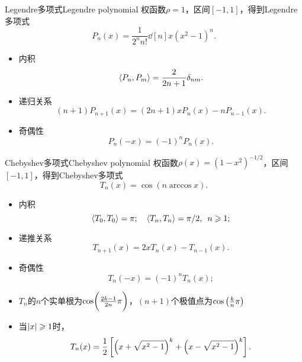\begin{example}
    {Legendre多项式}{Legendre polynomial}
    权函数$\rho=1$，区间$[-1,1]$，得到Legendre多项式
    \begin{equation}
        P_n(x)=\frac1{2^nn!}\dd[n]x(x^2-1)^n.
    \end{equation}
    \begin{itemize}
        \item 内积 
        \begin{equation}
            \left\langle P_n,P_m\right\rangle=\frac2{2n+1}\delta_{nm}.
        \end{equation}
        \item 递归关系
        \begin{equation}
            (n+1)P_{n+1}(x)=(2n+1)xP_n(x)-nP_{n-1}(x).
        \end{equation}
        \item 奇偶性
        \begin{equation}
            P_n(-x)=(-1)^nP_n(x).
        \end{equation}
    \end{itemize}
\end{example}

\begin{example}
    {Chebyshev多项式}{Chebyshev polynomial}
    权函数$\rho(x)=(1-x^2)^{-1/2}$，区间$[-1,1]$，得到Chebyshev多项式
    \begin{equation}
        T_n(x)=\cos(n\arccos x).
    \end{equation}
    \begin{itemize}
        \item 内积 
        \begin{equation}
            \left\langle T_0,T_0\right\rangle=\pi;\quad\left\langle T_n,T_n\right\rangle=\pi/2,\enspace n\geqslant 1;
        \end{equation}
        \item 递推关系
        \begin{equation}
            T_{n+1}(x)=2xT_n(x)-T_{n-1}(x).
        \end{equation}
        \item 奇偶性
        \begin{equation}
            T_n(-x)=(-1)^nT_n(x);
        \end{equation}
        \item $T_n$的$n$个实单根为$\cos\biggl(\frac{2k-1}{2n}\pi\biggr)$，$(n+1)$个极值点为$\cos\left(\frac kn\pi\right)$
        \item 当$\left\lvert x\right\rvert\geqslant 1$时，
        \begin{equation}
            T_n(x)=\frac12\left[\left(x+\sqrt{x^2-1}\right)^k+\left(x-\sqrt{x^2-1}\right)^k\right].
        \end{equation}
    \end{itemize}
\end{example}

